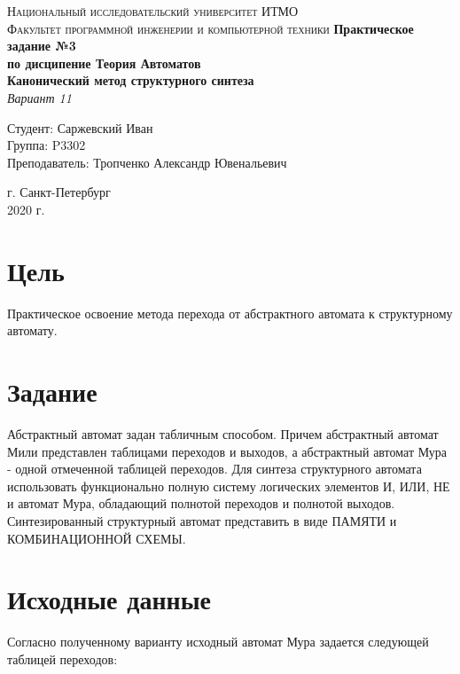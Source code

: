 \documentclass[12pt, a4paper]{article}
\begin{document}
\begin{titlepage}
\begin{center}

\textsc{Национальный исследовательский университет ИТМО\\[4mm]
Факультет программной инженерии и компьютерной техники}
\vfill
\textbf{Практическое задание №3\\[4mm]
по дисципение Теория Автоматов\\[4mm]
Канонический метод структурного синтеза\\[4mm]
}
\textit{Вариант 11\\[16mm]}
\begin{flushright}
Студент: Саржевский Иван
\\[2mm]Группа: P3302
\\[2mm]Преподаватель: Тропченко Александр Ювенальевич
\end{flushright}
\vfill
г. Санкт-Петербург\\[2mm]
2020 г.

\end{center}
\end{titlepage}

\section*{Цель}

Практическое освоение метода перехода от абстрактного автомата
к структурному автомату.

\section*{Задание}

Абстрактный автомат задан табличным способом. Причем абстрактный
автомат Мили представлен таблицами переходов и выходов, а абстрактный
автомат Мура - одной отмеченной таблицей переходов. Для синтеза
структурного автомата использовать функционально полную систему
логических элементов И, ИЛИ, НЕ и автомат Мура, обладающий полнотой
переходов и полнотой выходов. Синтезированный структурный автомат
представить в виде ПАМЯТИ и КОМБИНАЦИОННОЙ СХЕМЫ.

\section*{Исходные данные}

Согласно полученному варианту исходный автомат Мура задается
следующей таблицей переходов: 
\end{document}
